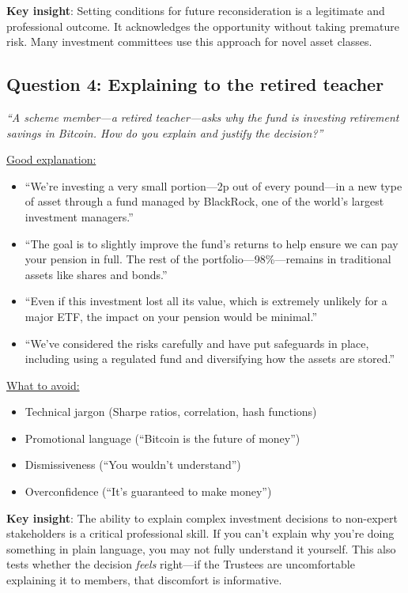 \documentclass[11pt]{article}
\begin{document}
\medskip
\noindent\textbf{Key insight}: Setting conditions for future reconsideration is a legitimate and professional outcome. It acknowledges the opportunity without taking premature risk. Many investment committees use this approach for novel asset classes.

\subsection*{Question 4: Explaining to the retired teacher}

\textit{``A scheme member---a retired teacher---asks why the fund is investing retirement savings in Bitcoin. How do you explain and justify the decision?''}

\medskip
\noindent\underline{Good explanation:}
\begin{itemize}[leftmargin=*]
\item ``We're investing a very small portion---2p out of every pound---in a new type of asset through a fund managed by BlackRock, one of the world's largest investment managers.''
\item ``The goal is to slightly improve the fund's returns to help ensure we can pay your pension in full. The rest of the portfolio---98\%---remains in traditional assets like shares and bonds.''
\item ``Even if this investment lost all its value, which is extremely unlikely for a major ETF, the impact on your pension would be minimal.''
\item ``We've considered the risks carefully and have put safeguards in place, including using a regulated fund and diversifying how the assets are stored.''
\end{itemize}

\medskip
\noindent\underline{What to avoid:}
\begin{itemize}[leftmargin=*]
\item Technical jargon (Sharpe ratios, correlation, hash functions)
\item Promotional language (``Bitcoin is the future of money'')
\item Dismissiveness (``You wouldn't understand'')
\item Overconfidence (``It's guaranteed to make money'')
\end{itemize}

\medskip
\noindent\textbf{Key insight}: The ability to explain complex investment decisions to non-expert stakeholders is a critical professional skill. If you can't explain why you're doing something in plain language, you may not fully understand it yourself. This also tests whether the decision \textit{feels} right---if the Trustees are uncomfortable explaining it to members, that discomfort is informative.
\end{document}
